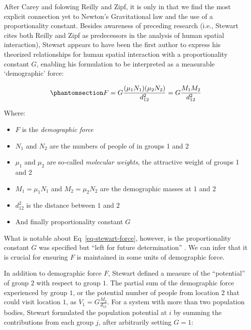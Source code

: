\documentclass[
  10pt,
  letterpaper,
]{article}
\providecommand{\tightlist}{%
  \setlength{\itemsep}{0pt}\setlength{\parskip}{0pt}}\usepackage{longtable,booktabs,array}
\begin{document}
After Carey and folowing Reilly and Zipf, it is only in
\citet{stewartDemographicGravitationEvidence1948} that we find the most
explicit connection yet to Newton's Gravitational law and the use of a
proportionality constant. Besides awareness of preceding research (i.e.,
Stewart cites both Reilly and Zipf as predecessors in the analysis of
human spatial interaction), Stewart appears to have been the first
author to express his theorized relationships for human spatial
interaction with a proportionality constant \(G\), enabling his
formulation to be interpreted as a measurable `demographic' force:

\begin{equation}\phantomsection\label{eq-stewart-force}{
F = G\frac{(\mu_1N_1)(\mu_2N_2)}{d_{12}^2} = G\frac{M_1 M_2}{d_{12}^2} 
}\end{equation}

\noindent Where:

\begin{itemize}
\tightlist
\item
  \(F\) is the \emph{demographic force}
\item
  \(N_1\) and \(N_2\) are the numbers of people of in groups 1 and 2
\item
  \(\mu_1\) and \(\mu_2\) are so-called \emph{molecular weights}, the
  attractive weight of groups 1 and 2
\item
  \(M_1 = \mu_1N_1\) and \(M_2 = \mu_2N_2\) are the demographic masses
  at 1 and 2
\item
  \(d_{12}^2\) is the distance between \(1\) and \(2\)
\item
  And finally proportionality constant \(G\)
\end{itemize}

What is notable about Eq~\ref{eq-stewart-force}, however, is the
proportionality constant \(G\) was specified but ``left for future
determination''
\citep[p.~34]{stewartDemographicGravitationEvidence1948}. We can infer
that it is crucial for ensuring \(F\) is maintained in some units of
demographic force.

In addition to demographic force \(F\), Stewart defined a measure of the
``potential'' of group \(2\) with respect to group \(1\). The partial
sum of the demographic force experienced by group \(1\), or the
potential number of people from location \(2\) that could visit location
\(1\), as \(V_1 = G\frac{M_2}{d_{12}}\). For a system with more than two
population bodies, Stewart formulated the population potential at \(i\)
by summing the contributions from each group \(j\), after arbitrarily
setting \(G=1\):
\end{document}
